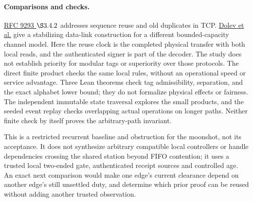 \documentclass[11pt]{article}
\begin{document}
\paragraph{Comparisons and checks.}
\href{https://datatracker.ietf.org/doc/html/rfc9293\#section-3.4.2}{RFC 9293
\(\S 3.4.2\)} addresses sequence reuse and old duplicates in TCP.
\href{https://arxiv.org/abs/1011.3632}{Dolev et al.} give a stabilizing
data-link construction for a different bounded-capacity channel model.
Here the reuse clock is the completed physical transfer with both local
reads, and the authenticated signer is part of the decoder. The study
does not establish priority for modular tags or superiority over those
protocols. The direct finite product checks the same local rules, without
an operational speed or service advantage. Three Lean theorems check
tag admissibility, separation, and the exact alphabet lower bound; they
do not formalize physical effects or fairness. The independent immutable
state traversal explores the small products, and the seeded event replay
checks overlapping actual operations on longer paths. Neither finite
check by itself proves the arbitrary-path invariant.

This is a restricted recurrent baseline and obstruction for the moonshot,
not its acceptance. It does not synthesize arbitrary compatible local
controllers or handle dependencies crossing the shared station beyond
FIFO contention; it uses a trusted local two-ended gate, authenticated
receipt sources and controlled age. An exact next comparison would make
one edge's current clearance depend on another edge's still unsettled duty,
and determine which prior proof can be reused without adding another
trusted observation.
\end{document}
